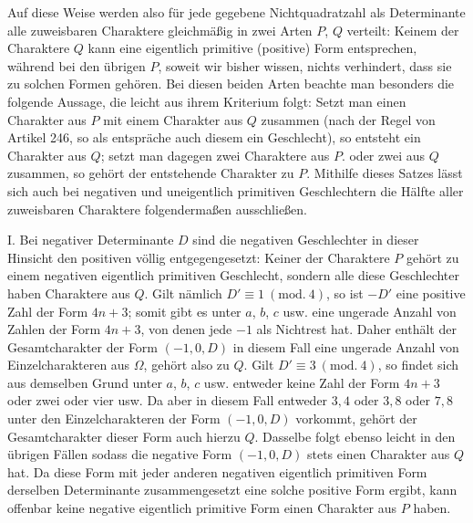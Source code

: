Auf diese Weise werden also für jede gegebene Nichtquadratzahl als Determinante alle zuweisbaren Charaktere gleichmäßig in zwei Arten $P$, $Q$ verteilt: Keinem der Charaktere $Q$ kann eine eigentlich primitive (positive) Form entsprechen, während bei den übrigen $P$, soweit wir bisher wissen, nichts verhindert, dass sie zu solchen Formen gehören. Bei diesen beiden Arten beachte man besonders die folgende Aussage, die leicht aus ihrem Kriterium folgt: Setzt man einen Charakter aus $P$ mit einem Charakter aus $Q$ zusammen (nach der Regel von Artikel 246, so als entspräche auch diesem ein Geschlecht), so entsteht ein Charakter aus $Q$; setzt man dagegen zwei Charaktere aus $P$. oder zwei aus $Q$ zusammen, so gehört der entstehende Charakter zu $P$. Mithilfe dieses Satzes lässt sich auch bei negativen und uneigentlich primitiven Geschlechtern die Hälfte aller zuweisbaren Charaktere folgendermaßen ausschließen.

I. Bei negativer Determinante $D$ sind die negativen Geschlechter in dieser Hinsicht den positiven völlig entgegengesetzt: Keiner der Charaktere $P$ gehört zu einem negativen eigentlich primitiven Geschlecht, sondern alle diese Geschlechter haben Charaktere aus $Q$. Gilt nämlich $D'\equiv1\ (\mathrm{mod.}\ 4)$, so ist $-D'$ eine positive Zahl der Form $4n+3$; somit gibt es unter $a$, $b$, $c$ usw. eine ungerade Anzahl von Zahlen der Form $4n+3$, von denen jede $-1$ als Nichtrest hat. Daher enthält der Gesamtcharakter der Form $(-1,0,D)$ in diesem Fall eine ungerade Anzahl von Einzelcharakteren aus $\Omega$, gehört also zu $Q$. Gilt $D'\equiv3\ (\mathrm{mod.}\ 4)$, so findet sich aus demselben Grund unter $a$, $b$, $c$ usw. entweder keine Zahl der Form $4n+3$ oder zwei oder vier usw. Da aber in diesem Fall entweder $3,4$ oder $3,8$ oder $7,8$ unter den Einzelcharakteren der Form $(-1,0,D)$ vorkommt, gehört der Gesamtcharakter dieser Form auch hier\textperiodcentered{}zu $Q$. Dasselbe folgt ebenso leicht in den übrigen Fällen
sodass die negative Form $(-1, 0, D)$ stets einen Charakter aus $Q$ hat. Da diese Form mit jeder anderen negativen eigentlich primitiven Form derselben Determinante zusammengesetzt eine solche positive Form ergibt, kann offenbar keine negative eigentlich primitive Form einen Charakter aus $P$ haben.

